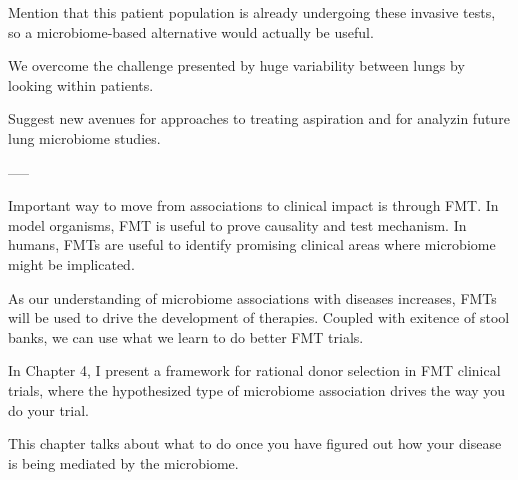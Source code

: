 Mention that this patient population is already undergoing these invasive tests, so a microbiome-based alternative would actually be useful.

We overcome the challenge presented by huge variability between lungs by looking within patients.

Suggest new avenues for approaches to treating aspiration and for analyzin future lung microbiome studies.

-----

Important way to move from associations to clinical impact is through FMT. In model organisms, FMT is useful to prove causality and test mechanism. In humans, FMTs are useful to identify promising clinical areas where microbiome might be implicated.

As our understanding of microbiome associations with diseases increases, FMTs will be used to drive the development of therapies. Coupled with exitence of stool banks, we can use what we learn to do better FMT trials.

In Chapter 4, I present a framework for rational donor selection in FMT clinical trials, where the hypothesized type of microbiome association drives the way you do your trial.

This chapter talks about what to do once you have figured out how your disease is being mediated by the microbiome.

\begin{singlespace}


\end{singlespace}
